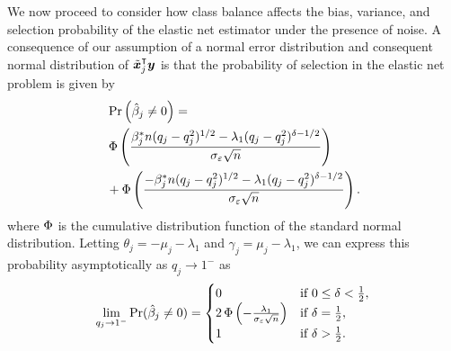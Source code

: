 We now proceed to consider how class balance affects the bias, variance, and selection
probability of the elastic net estimator under the presence of noise. A consequence of our
assumption of a normal error distribution and consequent normal distribution of
\(\tilde{\boldsymbol{x}}_j^\intercal \boldsymbol{y}\) is that the probability of selection in the elastic net
problem is given by
\begin{align}
  \label{eq:selection-probability}
   & \Pr\left(\hat{\beta}_j \neq 0\right) =                                                                                                       \nonumber
  \\
   & \operatorname{\Phi} \left( \frac{\beta_j^*n (q_j-q_j^2)^{1/2} - \lambda_1(q_j-q_j^2)^{\delta - 1/2}}{\sigma_\varepsilon \sqrt{n}}\right)                \nonumber     \\
   & + \operatorname{\Phi} \left( \frac{-\beta_j^*n (q_j-q_j^2)^{1/2} - \lambda_1(q_j-q_j^2)^{\delta - 1/2}}{\sigma_\varepsilon \sqrt{n}}\right).
\end{align}
where \(\operatorname{\Phi}\) is the cumulative distribution function of the standard normal distribution.
Letting \(\theta_j = -\mu_j - \lambda_1 \) and \(\gamma_j = \mu_j - \lambda_1\), we can
express this probability asymptotically as \(q_j \rightarrow 1^-\) as
\begin{equation}
  \label{eq:selection-probability-limit}
  \lim_{q_j \rightarrow 1^-} \Pr(\hat{\beta}_j \neq 0) =
  \begin{cases}
    0                                                                & \text{if } 0 \leq \delta < \frac{1}{2}, \\
    2\operatorname{\Phi}\left(-\frac{\lambda_1}{\sigma_\varepsilon \sqrt{n}}\right) & \text{if } \delta = \frac{1}{2},        \\
    1                                                                & \text{if } \delta > \frac{1}{2}.
  \end{cases}
\end{equation}


